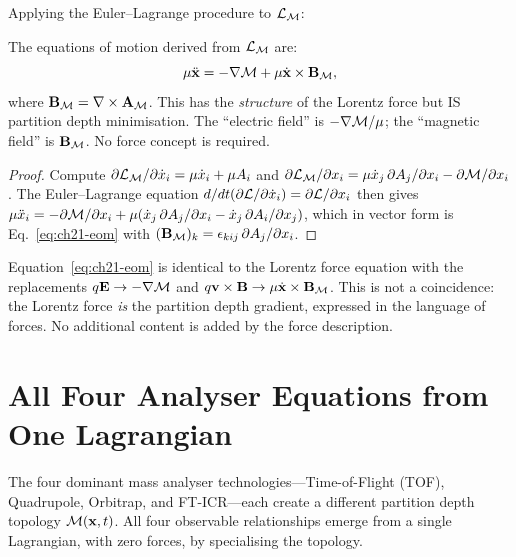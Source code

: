 Applying the Euler--Lagrange procedure to $\mathcal{L}_{\mathcal{M}}$:

\begin{theorem}
\label{thm:ch21-eom}
  The equations of motion derived from $\mathcal{L}_{\mathcal{M}}$ are:
  \begin{equation}\label{eq:ch21-eom}
    \mu\ddot{\mathbf{x}} = -\nabla\mathcal{M} + \mu\dot{\mathbf{x}}\times\mathbf{B}_{\mathcal{M}},
  \end{equation}
  where $\mathbf{B}_{\mathcal{M}} = \nabla\times\mathbf{A}_{\mathcal{M}}$.  This has the
  \emph{structure} of the Lorentz force but IS partition depth minimisation.
  The ``electric field'' is $-\nabla\mathcal{M}/\mu$; the ``magnetic field'' is
  $\mathbf{B}_{\mathcal{M}}$.  No force concept is required.
\end{theorem}

\begin{proof}
  Compute $\partial\mathcal{L}_{\mathcal{M}}/\partial\dot{x}_i = \mu\dot{x}_i +
  \mu A_i$ and $\partial\mathcal{L}_{\mathcal{M}}/\partial x_i = \mu\dot{x}_j\,
  \partial A_j/\partial x_i - \partial\mathcal{M}/\partial x_i$.  The Euler--Lagrange
  equation $d/dt(\partial\mathcal{L}/\partial\dot{x}_i) = \partial\mathcal{L}/\partial x_i$
  then gives $\mu\ddot{x}_i = -\partial\mathcal{M}/\partial x_i +
  \mu(\dot{x}_j\,\partial A_j/\partial x_i - \dot{x}_j\,\partial A_i/\partial
  x_j)$, which in vector form is Eq.~\eqref{eq:ch21-eom} with
  $(\mathbf{B}_{\mathcal{M}})_k = \epsilon_{kij}\,\partial A_j/\partial x_i$.
\end{proof}

\begin{remark}
  Equation~\eqref{eq:ch21-eom} is identical to the Lorentz force equation with
  the replacements $q\mathbf{E} \to -\nabla\mathcal{M}$ and $q\mathbf{v}\times
  \mathbf{B} \to \mu\dot{\mathbf{x}}\times\mathbf{B}_{\mathcal{M}}$.  This is not a
  coincidence: the Lorentz force \emph{is} the partition depth gradient,
  expressed in the language of forces.  No additional content is added by the
  force description.
\end{remark}

\section{All Four Analyser Equations from One Lagrangian}
\label{sec:ch21-analysers}

The four dominant mass analyser technologies---Time-of-Flight (TOF),
Quadrupole, Orbitrap, and FT-ICR---each create a different partition depth
topology $\mathcal{M}(\mathbf{x},t)$.  All four observable relationships emerge
from a single Lagrangian, with zero forces, by specialising the topology.

